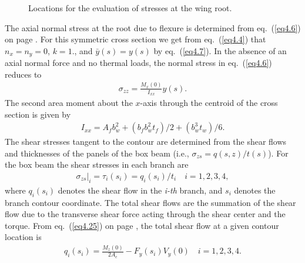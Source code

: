 \documentclass{AeroStructure-ERJohnson}
\begin{document}
{\def\thefigure{14.8}
\begin{figure}[H]
{\caption{Locations for the evaluation of stresses at the wing root.\label{fig14.8}}}
\end{figure}
}

\noindent The axial normal stress at the root due to flexure is determined from eq.~(\ref{eq4.6}) on page \pageref{eq4.6}. For this symmetric cross section we get from eq.~(\ref{eq4.4}) that $n_{x}=n_{y}=0$, $k=1$., and $\bar{y}(s)=y(s)$ by eq.~(\ref{eq4.7}). In the absence of an axial normal force and no thermal loads, the normal stress in eq.~(\ref{eq4.6}) reduces to
\begin{align}\label{eq14.25}
\sigma_{z z}=\frac{M_{x}(0)}{I_{x x}} y(s).
\end{align}
The second area moment about the $x$-axis through the centroid of the cross section is given by
\begin{align}\label{eq14.26}
I_{x x}=A_{f} b_{w}^{2}+(b_f b_{w}^{2} t_{f})/2+(b_{w}^{3} t_{w})/6.
\end{align}
\noindent The shear stresses tangent to the contour are determined from the shear flows and thicknesses of the panels of the box beam (i.e., $\sigma_{z s}=q(s, z)/t(s)$). For the box beam the shear stresses in each branch are
\begin{align}\label{eq14.27}
\left.\sigma_{z s}\right|_{i}=\tau_{i}\left(s_{i}\right)=q_{i}\left(s_{i}\right)/t_{i} \quad i=1,2,3,4,
\end{align}
where $q_{i}\left(s_{i}\right)$ denotes the shear flow in the \textit{i-th} branch, and $s_{i}$ denotes the branch contour coordinate. The total shear flows are the summation of the shear flow due to the transverse shear force acting through the shear center and the torque. From eq.~(\ref{eq4.25}) on page \pageref{eq4.25}, the total shear flow at a given contour location is
\begin{align}\label{eq14.28}
q_{i}\left(s_{i}\right)=\frac{M_{z}(0)}{2 A_{c}}-F_{y}\left(s_{i}\right) V_{y}(0) \quad i=1,2,3,4.
\end{align}
\end{document}
